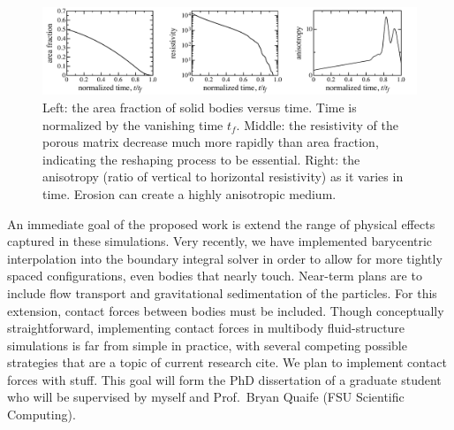 \documentclass[11pt]{article}
\begin{document}
\begin{figure}%
\begin{center}
\includegraphics[width = 0.99 \textwidth]{./figs/fig3.pdf}
\caption{\label{fig3} Left: the area fraction of solid bodies versus time. Time is normalized by the vanishing time $t_f$. Middle: the resistivity of the porous matrix decrease much more rapidly than area fraction, indicating the reshaping process to be essential. Right: the anisotropy (ratio of vertical to horizontal resistivity) as it varies in time. Erosion can create a highly anisotropic medium.
}
\end{center}
\end{figure}



An immediate goal of the proposed work is extend the range of physical effects captured in these simulations. Very recently, we have implemented barycentric interpolation into the boundary integral solver in order to allow for more tightly spaced configurations, even bodies that nearly touch. Near-term plans are to include flow transport and gravitational sedimentation of the particles. For this extension, contact forces between bodies must be included. Though conceptually straightforward, implementing contact forces in multibody fluid-structure simulations is far from simple in practice, with several competing possible strategies that are a topic of current research  {\color{blue} cite}. We plan to implement contact forces with {\color{blue} stuff}. This goal will form the PhD dissertation of a graduate student who will be supervised by myself and Prof.~Bryan Quaife (FSU Scientific Computing).
\end{document}
